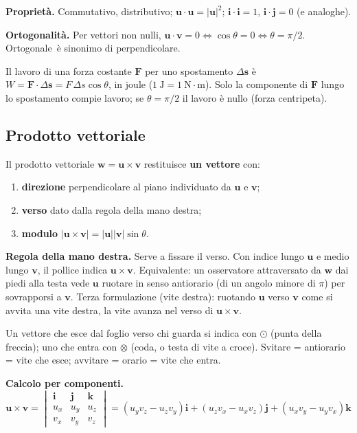 \documentclass[11pt,a4paper]{article}
\newcommand{\vv}[1]{\mathbf{#1}}
\newcommand{\mo}[1]{\left|#1\right|}
\newcommand{\unit}[1]{\ \mathrm{#1}}
\begin{document}
\textbf{Proprietà.} Commutativo, distributivo; $\vv u\cdot\vv u=\mo{\vv u}^2$; $\vv i\cdot\vv i=1$, $\vv i\cdot\vv j=0$ (e analoghe).

\textbf{Ortogonalità.} Per vettori non nulli, $\vv u\cdot\vv v=0\iff\cos\theta=0\iff\theta=\pi/2$. \guillemotleft Ortogonale\guillemotright\ è sinonimo di \guillemotleft perpendicolare\guillemotright.

\begin{richiamo}
Il lavoro di una forza costante $\vv F$ per uno spostamento $\Delta\vv s$ è $W=\vv F\cdot\Delta\vv s=F\,\Delta s\cos\theta$, in joule ($1\unit{J}=1\unit{N\cdot m}$). Solo la componente di $\vv F$ lungo lo spostamento compie lavoro; se $\theta=\pi/2$ il lavoro è nullo (forza centripeta).
\end{richiamo}

\subsection{Prodotto vettoriale}
Il prodotto vettoriale $\vv w=\vv u\times\vv v$ restituisce \textbf{un vettore} con:
\begin{enumerate}[nosep]
\item \textbf{direzione} perpendicolare al piano individuato da $\vv u$ e $\vv v$;
\item \textbf{verso} dato dalla regola della mano destra;
\item \textbf{modulo} $\mo{\vv u\times\vv v}=\mo{\vv u}\mo{\vv v}\sin\theta$.
\end{enumerate}

\textbf{Regola della mano destra.} Serve a fissare il verso. Con indice lungo $\vv u$ e medio lungo $\vv v$, il pollice indica $\vv u\times\vv v$. Equivalente: un osservatore attraversato da $\vv w$ dai piedi alla testa vede $\vv u$ ruotare in senso antiorario (di un angolo minore di $\pi$) per sovrapporsi a $\vv v$. Terza formulazione (vite destra): ruotando $\vv u$ verso $\vv v$ come si avvita una vite destra, la vite avanza nel verso di $\vv u\times\vv v$.

\begin{richiamo}
Un vettore che esce dal foglio verso chi guarda si indica con $\odot$ (punta della freccia); uno che entra con $\otimes$ (coda, o testa di vite a croce). Svitare = antiorario = vite che esce; avvitare = orario = vite che entra.
\end{richiamo}

\textbf{Calcolo per componenti.}
\begin{equation}
\vv u\times\vv v=\begin{vmatrix}\vv i&\vv j&\vv k\\u_x&u_y&u_z\\v_x&v_y&v_z\end{vmatrix}=(u_yv_z-u_zv_y)\vv i+(u_zv_x-u_xv_z)\vv j+(u_xv_y-u_yv_x)\vv k
\end{equation}
\end{document}
